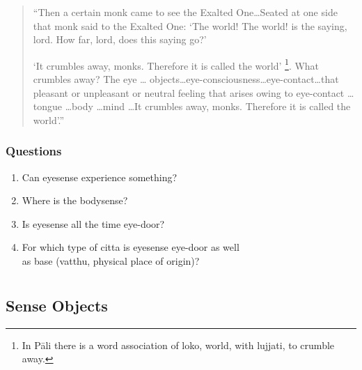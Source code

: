 \documentclass{book}
\begin{document}
\begin{quotation}\begin{flushleft}

``Then a certain monk came to see the Exalted One\ldots Seated at one side
that monk said to the Exalted One: `The world! The world! is the
saying, lord. How far, lord, does this saying go?'

`It crumbles away, monks. Therefore it is called the world'
\footnote{In P{\=a}li there is a word association of loko, world,
with lujjati, to crumble away.}. What crumbles away? The eye \ldots
objects\ldots eye-consciousness\ldots eye-contact\ldots that pleasant or
unpleasant or neutral feeling that arises owing to eye-contact \ldots
tongue \ldots body \ldots mind \ldots It crumbles away, monks. Therefore it is called the world'.''
\end{flushleft}\end{quotation}






\subsection*{Questions}




\begin{enumerate}
\item Can eyesense experience something?

\item Where is the bodysense?

\item Is eyesense all the time eye-door?

\item For which type of citta is eyesense eye-door as well\\ as base
(vatthu, physical place of origin)? 

\end{enumerate}

















\chapter[Sense Objects]{} 
\section*{Sense Objects}
\end{document}

